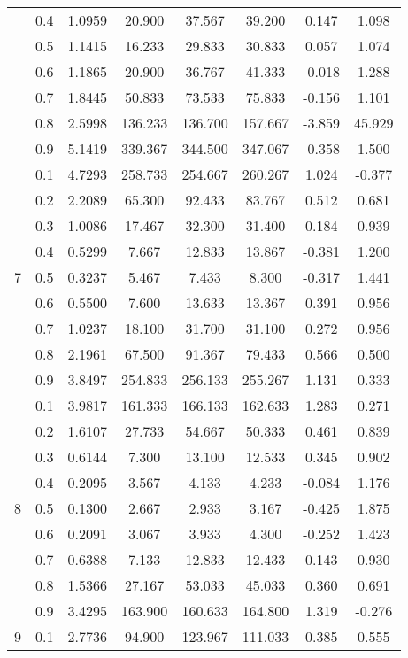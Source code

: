\documentclass[11pt,a4paper]{report}
\begin{document}
\begin{longtable}{ | c | c || c | c | c | c | c | c | }
 & 0.4 & 1.0959 & 20.900 & 37.567 & 39.200 & 0.147 & 1.098 \\
 & 0.5 & 1.1415 & 16.233 & 29.833 & 30.833 & 0.057 & 1.074 \\
 & 0.6 & 1.1865 & 20.900 & 36.767 & 41.333 & -0.018 & 1.288 \\
 & 0.7 & 1.8445 & 50.833 & 73.533 & 75.833 & -0.156 & 1.101 \\
 & 0.8 & 2.5998 & 136.233 & 136.700 & 157.667 & -3.859 & 45.929 \\
 & 0.9 & 5.1419 & 339.367 & 344.500 & 347.067 & -0.358 & 1.500 \\
 \hline
\multirow{9}{*}{7} & 0.1 & 4.7293 & 258.733 & 254.667 & 260.267 & 1.024 & -0.377 \\
 & 0.2 & 2.2089 & 65.300 & 92.433 & 83.767 & 0.512 & 0.681 \\
 & 0.3 & 1.0086 & 17.467 & 32.300 & 31.400 & 0.184 & 0.939 \\
 & 0.4 & 0.5299 & 7.667 & 12.833 & 13.867 & -0.381 & 1.200 \\
 & 0.5 & 0.3237 & 5.467 & 7.433 & 8.300 & -0.317 & 1.441 \\
 & 0.6 & 0.5500 & 7.600 & 13.633 & 13.367 & 0.391 & 0.956 \\
 & 0.7 & 1.0237 & 18.100 & 31.700 & 31.100 & 0.272 & 0.956 \\
 & 0.8 & 2.1961 & 67.500 & 91.367 & 79.433 & 0.566 & 0.500 \\
 & 0.9 & 3.8497 & 254.833 & 256.133 & 255.267 & 1.131 & 0.333 \\
 \hline
\multirow{9}{*}{8} & 0.1 & 3.9817 & 161.333 & 166.133 & 162.633 & 1.283 & 0.271 \\
 & 0.2 & 1.6107 & 27.733 & 54.667 & 50.333 & 0.461 & 0.839 \\
 & 0.3 & 0.6144 & 7.300 & 13.100 & 12.533 & 0.345 & 0.902 \\
 & 0.4 & 0.2095 & 3.567 & 4.133 & 4.233 & -0.084 & 1.176 \\
 & 0.5 & 0.1300 & 2.667 & 2.933 & 3.167 & -0.425 & 1.875 \\
 & 0.6 & 0.2091 & 3.067 & 3.933 & 4.300 & -0.252 & 1.423 \\
 & 0.7 & 0.6388 & 7.133 & 12.833 & 12.433 & 0.143 & 0.930 \\
 & 0.8 & 1.5366 & 27.167 & 53.033 & 45.033 & 0.360 & 0.691 \\
 & 0.9 & 3.4295 & 163.900 & 160.633 & 164.800 & 1.319 & -0.276 \\
 \hline
\multirow{9}{*}{9} & 0.1 & 2.7736 & 94.900 & 123.967 & 111.033 & 0.385 & 0.555 \\

\end{longtable}
\end{document}
